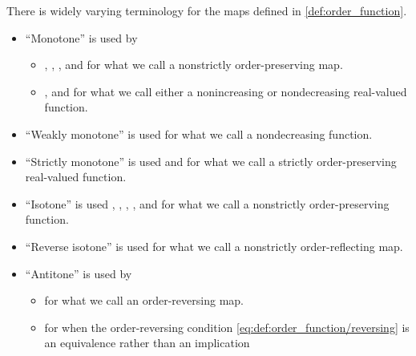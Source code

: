 \begin{remark}\label{rem:order_homomorphism_terminology}
  There is widely varying terminology for the maps defined in \cref{def:order_function}.

  \begin{itemize}
    \item \enquote{Monotone} is used by
    \begin{itemize}
      \item {}, , ,  and  for what we call a nonstrictly order-preserving map.

      \item {},  and  for what we call either a nonincreasing or nondecreasing real-valued function.
    \end{itemize}

    \item \enquote{Weakly monotone} is used  for what we call a nondecreasing function.

    \item \enquote{Strictly monotone} is used  and  for what we call a strictly order-preserving real-valued function.

    \item \enquote{Isotone} is used , , , ,  and  for what we call a nonstrictly order-preserving function.

    \item \enquote{Reverse isotone} is used  for what we call a nonstrictly order-reflecting map.

    \item \enquote{Antitone} is used by
    \begin{itemize}
      \item {} for what we call an order-reversing map.
      \item {} for when the order-reversing condition \eqref{eq:def:order_function/reversing} is an equivalence rather than an implication
    \end{itemize}


\end{itemize}
\end{remark}
